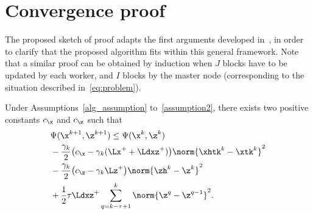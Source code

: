 \section{Convergence proof} \label{sec:cv_proof}
The proposed sketch of proof adapts the first arguments developed in~\cite{Cannelli2016}, in order to clarify that the proposed algorithm fits within this general framework. Note that a similar proof can be obtained by induction when $J$ blocks have to be updated by each worker, and $I$ blocks by the master node (corresponding to the situation described in~\eqref{eq:problem}).

\begin{lemma} \label{lemma1}
Under Assumptions~\ref{alg_assumption} to~\ref{assumption2}, there exists two positive constants $c_\x$ and $c_\z$ such that
\begin{align}
& \Psi(\x^{k+1},\z^{k+1}) \leq \Psi(\x^k,\z^k) \nonumber\\
& - \frac{\gamma_k}{2} \bigl( c_\x - \gamma_k (\Lx^+ + \Ldxz^+) \bigr) \norm{\xhtk^k - \xtk^k}^2  \nonumber\\
& - \frac{\gamma_k}{2} \bigl(c_\z - \gamma_k \Lz^+ \bigr) \norm{\zh^k - \z^k}^2 \nonumber\\
& + \frac{1}{2} \tau \Ldxz^+ \sum_{q = k-\tau+1}^k \norm{\z^q - \z^{q - 1}}^2 \label{eq:lemma1}.
\end{align}
\end{lemma}

